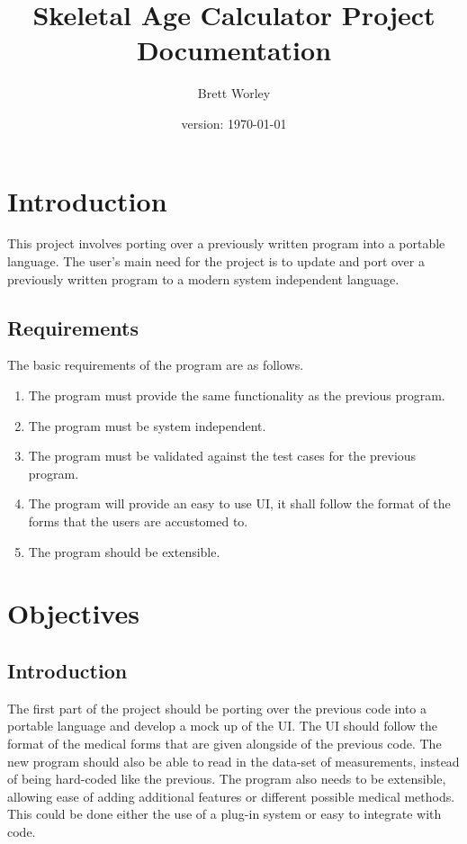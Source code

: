 \documentclass[12pt,letterpaper]{article}
\author{Brett Worley}
\title{Skeletal Age Calculator Project Documentation}
\date{version: \today}
\begin{document}
\maketitle
\tableofcontents

\section{Introduction}

This project involves porting over a previously written program into a portable language. The user's main need for the project is to update and port over a previously written program to a modern system independent language. 

\subsection{Requirements}

The basic requirements of the program are as follows.

\begin{enumerate}

\item The program must provide the same functionality as the previous program.
\item The program must be system independent.
\item The program must be validated against the test cases for the previous program.
\item The program will provide an easy to use UI, it shall follow the format of the forms that the users are accustomed to.
\item The program should be extensible.

\end{enumerate}

\section{Objectives}

\subsection{Introduction}

The first part of the project should be porting over the previous code into a portable language and develop a mock up of the UI. The UI should follow the format of the medical forms that are given alongside of the previous code. The new program should also be able to read in the data-set of measurements, instead of being hard-coded like the previous. The program also needs to be extensible, allowing ease of adding additional features or different possible medical methods. This could be done either the use of a plug-in system or easy to integrate with code.
\end{document}
